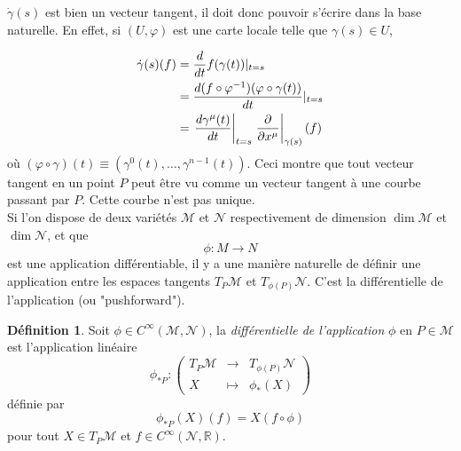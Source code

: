 \documentclass[a4paper,11pt]{report}
\theoremstyle{definition}
\theoremstyle{plain}
\theoremstyle{definition}
\newtheorem{defn}{Définition}[chapter]
\theoremstyle{remark}
\newcommand{\M}{\mathscr{M}}
\newcommand{\N}{\mathscr{N}}
\begin{document}
                $\dot{\gamma}(s)$ est bien un vecteur tangent, il doit donc pouvoir s'écrire dans la base naturelle. En effet, si $(U,\varphi)$ est une carte locale telle que $\gamma(s)\in U$,
                
                \begin{align}
                    \dot{\gamma}(s)(f) &= \frac{d}{dt}f(\gamma(t))|_{t=s} \\
                    &= \frac{d(f\circ\varphi^{-1})(\varphi\circ\gamma(t))}{dt}|_{t=s}\\
                    &= \eval{\frac{d\gamma^\mu(t)}{dt}}_{t=s}\eval{\pdv{}{x^\mu}}_{\gamma(s)}(f)
                \end{align}
                où $(\varphi\circ\gamma)(t)\equiv(\gamma^0(t),\dots,\gamma^{n-1}(t))$. Ceci montre que tout vecteur tangent en un point $P$ peut être vu comme un vecteur tangent à une courbe passant par $P$. Cette courbe n'est pas unique.\\
                
                Si l'on dispose de deux variétés $\M$ et $\N$ respectivement de dimension $\dim\M$ et $\dim\N$, et que 
                \begin{equation*}
                    \phi : M\to N
                \end{equation*}
                est une application différentiable, il y a une manière naturelle de définir une application entre les espaces tangents $T_P\M$ et $T_{\phi(P)}\N$. C'est la différentielle de l'application (ou "pushforward").
                
                \begin{defn}
                    Soit $\phi\in C^\infty(\M,\N)$, la \textit{différentielle de l'application} $\phi$ en $P\in\M$ est l'application linéaire
                    \begin{equation}
                        \phi_{*P}:\left(
                    \begin{array}{ccc}
                        T_P\M & \longrightarrow & T_{\phi(P)}\N \\
                        X & \longmapsto & \phi_*(X)
                    \end{array}
                    \right)
                    \end{equation}
                    définie par
                    \begin{equation}
                        \phi_{*P}(X)(f) = X(f\circ\phi)
                    \end{equation}
                    pour tout $X\in T_P\M$ et $f\in C^{\infty}(\N,\mathbb{R})$.
                \end{defn}
                
\end{document}
